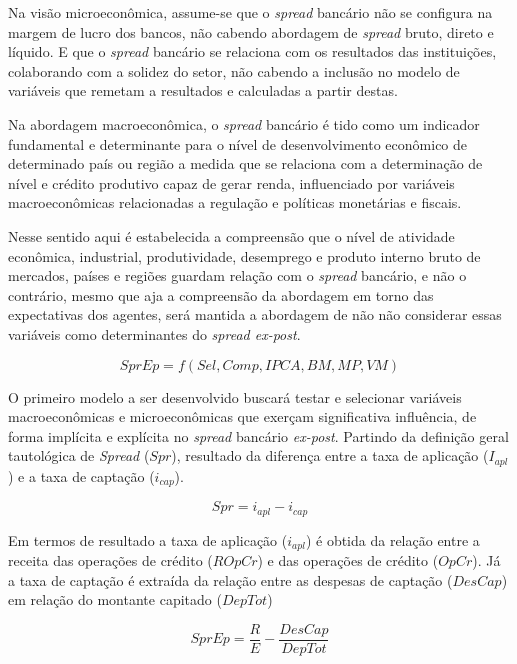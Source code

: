 \documentclass[
  12pt,
  12pt,
  openright,
  oneside,
  a4paper,
  chapter=TITLE,
  section=TITLE,
  subsection=TITLE,
  subsubsection=TITLE,
  english,
  portugues,
  sumario=tradicional]{abntex2}
\begin{document}
Na visão microeconômica, assume-se que o \emph{spread} bancário não se configura na margem de lucro dos bancos, não cabendo abordagem de \emph{spread} bruto, direto e líquido. E que o \emph{spread} bancário se relaciona com os resultados das instituições, colaborando com a solidez do setor, não cabendo a inclusão no modelo de variáveis que remetam a resultados e calculadas a partir destas.

Na abordagem macroeconômica, o \emph{spread} bancário é tido como um indicador fundamental e determinante para o nível de desenvolvimento econômico de determinado país ou região a medida que se relaciona com a determinação de nível e crédito produtivo capaz de gerar renda, influenciado por variáveis macroeconômicas relacionadas a regulação e políticas monetárias e fiscais.

Nesse sentido aqui é estabelecida a compreensão que o nível de atividade econômica, industrial, produtividade, desemprego e produto interno bruto de mercados, países e regiões guardam relação com o \emph{spread} bancário, e não o contrário, mesmo que aja a compreensão da abordagem em torno das expectativas dos agentes, será mantida a abordagem de não não considerar essas variáveis como determinantes do \emph{spread ex-post}.

\begin{equation}
SprEp = f(Sel,Comp,IPCA,BM,MP,VM)
\end{equation}

O primeiro modelo a ser desenvolvido buscará testar e selecionar variáveis macroeconômicas e microeconômicas que exerçam significativa influência, de forma implícita e explícita no \emph{spread} bancário \emph{ex-post}. Partindo da definição geral tautológica de \emph{Spread} (\(Spr\)), resultado da diferença entre a taxa de aplicação (\(I_{apl}\)) e a taxa de captação (\(i_{cap}\)).

\begin{equation}
Spr = i_{apl} - i_{cap} 
\end{equation}

Em termos de resultado a taxa de aplicação (\(i_{apl}\)) é obtida da relação entre a receita das operações de crédito (\(ROpCr\)) e das operações de crédito (\(OpCr\)). Já a taxa de captação é extraída da relação entre as despesas de captação (\(DesCap\)) em relação do montante capitado (\(DepTot\))

\begin{equation}
SprEp = \frac{R}{E} - \frac{DesCap}{DepTot}
\end{equation}
\end{document}
